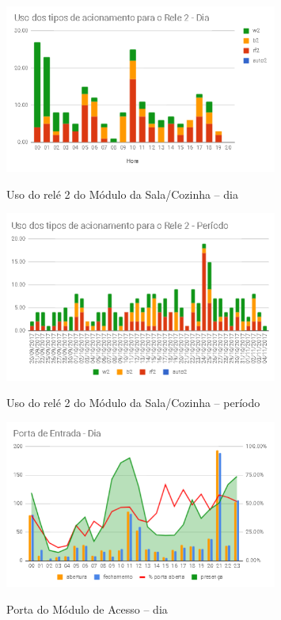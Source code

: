 \begin{figure}[H]
	\centering
	\caption{Uso do relé 2 do Módulo da Sala/Cozinha -- dia}
	\includegraphics[width=0.8\textwidth]{usorele2salacozinhadia}
	\label{fig:usorele2salacozinhadia}
\end{figure}

\begin{figure}[H]
	\centering
	\caption{Uso do relé 2 do Módulo da Sala/Cozinha -- período}
	\includegraphics[width=0.8\textwidth]{usorele2salacozinhaperiodo}
	\label{fig:usorele2salacozinhaperiodo}
\end{figure}

\begin{figure}[H]
	\centering
	\caption{Porta do Módulo de Acesso -- dia}
	\includegraphics[width=0.8\textwidth]{portaentradadia}
	\label{fig:portaentradadia}
\end{figure}

